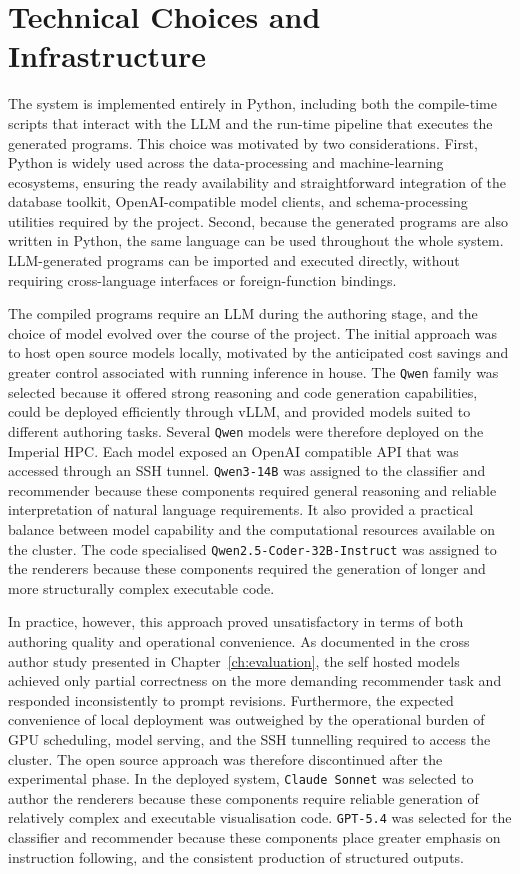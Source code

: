 \section{Technical Choices and Infrastructure}
\label{sec:impl-tech}

The system is implemented entirely in Python, including both the compile-time scripts that interact with the LLM and the run-time pipeline that executes the generated programs. This choice was motivated by two considerations. First, Python is widely used across the data-processing and machine-learning ecosystems, ensuring the ready availability and straightforward integration of the database toolkit, OpenAI-compatible model clients, and schema-processing utilities required by the project. Second, because the generated programs are also written in Python, the same language can be used throughout the whole system. LLM-generated programs can be imported and executed directly, without requiring cross-language interfaces or foreign-function bindings. 

The compiled programs require an LLM during the authoring stage, and the choice of model evolved over the course of the project. The initial approach was to host open source models locally, motivated by the anticipated cost savings and greater control associated with running inference in house. The \texttt{Qwen} family was selected because it offered strong reasoning and code generation capabilities, could be deployed efficiently through vLLM, and provided models suited to different authoring tasks. Several \texttt{Qwen} models were therefore deployed on the Imperial HPC. Each model exposed an OpenAI compatible API that was accessed through an SSH tunnel. \texttt{Qwen3-14B} was assigned to the classifier and recommender because these components required general reasoning and reliable interpretation of natural language requirements. It also provided a practical balance between model capability and the computational resources available on the cluster. The code specialised \texttt{Qwen2.5-Coder-32B-Instruct} was assigned to the renderers because these components required the generation of longer and more structurally complex executable code.

In practice, however, this approach proved unsatisfactory in terms of both authoring quality and operational convenience. As documented in the cross author study presented in Chapter~\ref{ch:evaluation}, the self hosted models achieved only partial correctness on the more demanding recommender task and responded inconsistently to prompt revisions. Furthermore, the expected convenience of local deployment was outweighed by the operational burden of GPU scheduling, model serving, and the SSH tunnelling required to access the cluster. The open source approach was therefore discontinued after the experimental phase. In the deployed system, \texttt{Claude Sonnet} was selected to author the renderers because these components require reliable generation of relatively complex and executable visualisation code. \texttt{GPT-5.4} was selected for the classifier and recommender because these components place greater emphasis on instruction following, and the consistent production of structured outputs.

